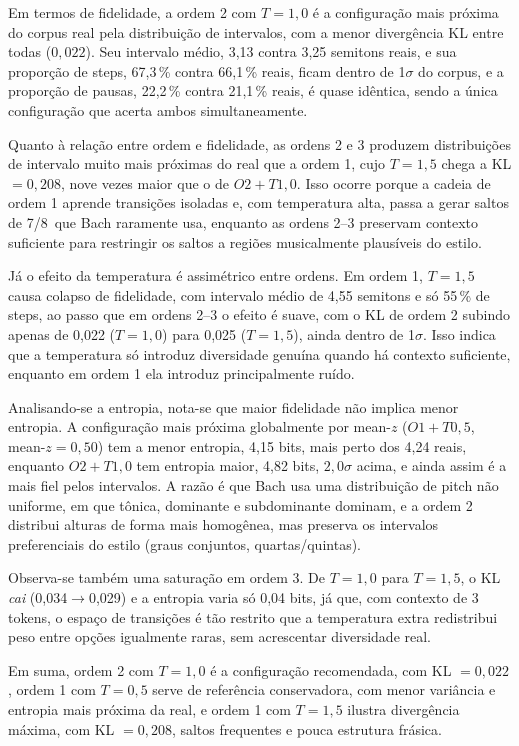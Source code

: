\documentclass{article}
\begin{document}
Em termos de fidelidade, a ordem 2 com $T=1{,}0$ é a configuração mais próxima
do corpus real pela distribuição de intervalos, com a menor divergência KL entre
todas ($0{,}022$). Seu intervalo médio, 3,13 contra 3,25 semitons reais, e sua
proporção de steps, 67,3\,\% contra 66,1\,\% reais, ficam dentro de 1$\sigma$ do
corpus, e a proporção de pausas, 22,2\,\% contra 21,1\,\% reais, é quase
idêntica, sendo a única configuração que acerta ambos simultaneamente.

Quanto à relação entre ordem e fidelidade, as ordens 2 e 3 produzem
distribuições de intervalo muito mais próximas do real que a ordem 1, cujo
$T=1{,}5$ chega a KL $=0{,}208$, nove vezes maior que o de $O2{+}T1{,}0$. Isso
ocorre porque a cadeia de ordem 1 aprende transições isoladas e, com temperatura
alta, passa a gerar saltos de 7\textordmasculine/8\textordmasculine\ que Bach
raramente usa, enquanto as ordens 2--3 preservam contexto suficiente para
restringir os saltos a regiões musicalmente plausíveis do estilo.

Já o efeito da temperatura é assimétrico entre ordens. Em ordem 1, $T=1{,}5$
causa colapso de fidelidade, com intervalo médio de 4,55 semitons e só 55\,\% de
steps, ao passo que em ordens 2--3 o efeito é suave, com o KL de ordem 2 subindo
apenas de 0,022 ($T{=}1{,}0$) para 0,025 ($T{=}1{,}5$), ainda dentro de
1$\sigma$. Isso indica que a temperatura só introduz diversidade genuína quando
há contexto suficiente, enquanto em ordem 1 ela introduz principalmente ruído.

Analisando-se a entropia, nota-se que maior fidelidade não implica menor
entropia. A configuração mais próxima globalmente por mean-$z$ ($O1{+}T0{,}5$,
mean-$z=0{,}50$) tem a menor entropia, 4,15 bits, mais perto dos 4,24 reais,
enquanto $O2{+}T1{,}0$ tem entropia maior, 4,82 bits, $2{,}0\sigma$ acima, e
ainda assim é a mais fiel pelos intervalos. A razão é que Bach usa uma
distribuição de pitch não uniforme, em que tônica, dominante e subdominante
dominam, e a ordem 2 distribui alturas de forma mais homogênea, mas preserva os
intervalos preferenciais do estilo (graus conjuntos, quartas/quintas).

Observa-se também uma saturação em ordem 3. De $T{=}1{,}0$ para $T{=}1{,}5$, o
KL \emph{cai} (0,034$\to$0,029) e a entropia varia só 0,04 bits, já que, com
contexto de 3 tokens, o espaço de transições é tão restrito que a temperatura
extra redistribui peso entre opções igualmente raras, sem acrescentar
diversidade real.

Em suma, ordem 2 com $T{=}1{,}0$ é a configuração recomendada, com KL
$=0{,}022$, ordem 1 com $T{=}0{,}5$ serve de referência conservadora, com menor
variância e entropia mais próxima da real, e ordem 1 com $T{=}1{,}5$ ilustra
divergência máxima, com KL $=0{,}208$, saltos frequentes e pouca estrutura
frásica.
\end{document}
